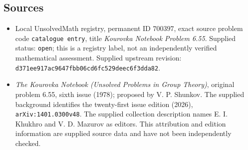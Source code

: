 \documentclass[11pt]{article}
\begin{document}
\subsection{Sources}
\begin{itemize}
\item Local UnsolvedMath registry, permanent ID \(700397\), exact source problem code \texttt{catalogue entry}, title \emph{Kourovka Notebook Problem 6.55}. Supplied status: \texttt{open}; this is a registry label, not an independently verified mathematical assessment. Supplied upstream revision: \texttt{d371ee917ac9647fbb06cd6fc529deec6f3dda82}.
\item \emph{The Kourovka Notebook (Unsolved Problems in Group Theory)}, original problem 6.55, sixth issue (1978); proposed by V. P. Shunkov. The supplied background identifies the twenty-first issue edition (2026), \texttt{arXiv:1401.0300v48}. The supplied collection description names E. I. Khukhro and V. D. Mazurov as editors. This attribution and edition information are supplied source data and have not been independently checked.
\end{itemize}
\end{document}

